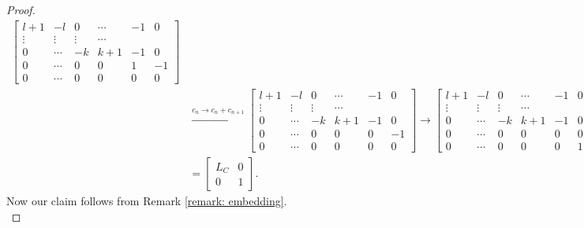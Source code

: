 \documentclass[11pt,reqno]{amsart}
\theoremstyle{definition}
\theoremstyle{plain}
\begin{document}
\begin{proof}
\begin{align}
\begin{bmatrix}
				l + 1 & -l & 0 & \cdots & -1 & 0 \\
				\vdots & \vdots & \vdots & \cdots \\
				0 & \cdots & -k & k+1 & -1 &0 \\
				0 & \cdots & 0 & 0 & 1 & -1 \\
				0 & \cdots & 0 & 0 & 0 & 0 
			\end{bmatrix} \\
			&\stackrel{c_{n} \to c_{n} + c_{n+1}}\longrightarrow
			\begin{bmatrix} 
				l + 1 & -l & 0 & \cdots & -1 & 0 \\
				\vdots & \vdots & \vdots & \cdots \\
				0 & \cdots & -k & k+1 & -1 &0 \\
				0 & \cdots & 0 & 0 & 0 & -1 \\
				0 & \cdots & 0 & 0 & 0 & 0 
			\end{bmatrix}
			\longrightarrow
			\begin{bmatrix} 
				l + 1 & -l & 0 & \cdots & -1 & 0 \\
				\vdots & \vdots & \vdots & \cdots \\
				0 & \cdots & -k & k+1 & -1 &0 \\
				0 & \cdots & 0 & 0 & 0 & 0 \\
				0 & \cdots & 0 & 0 & 0 & 1 
			\end{bmatrix}\\
			&=
			\left[ \begin{array}{c|c}
				L_C & 0 \\
				\hline
				0 & 1
			\end{array} \right].
			\end{align}
Now our claim follows from Remark \ref{remark: embedding}. \\


\end{proof}
\end{document}

